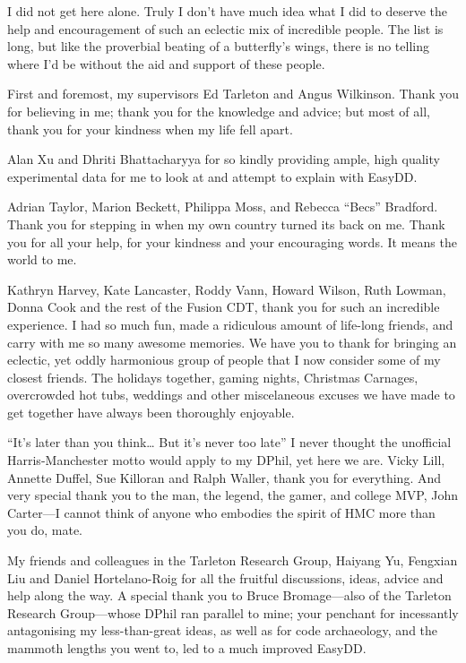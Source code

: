 \begin{frontmatter}[Acknowledgements]

    \begin{justify}
        I did not get here alone. Truly I don't have much idea what I did to deserve the help and encouragement of such an eclectic mix of incredible people. The list is long, but like the proverbial beating of a butterfly's wings, there is no telling where I'd be without the aid and support of these people.

        First and foremost, my supervisors Ed Tarleton and Angus Wilkinson. Thank you for believing in me; thank you for the knowledge and advice; but most of all, thank you for your kindness when my life fell apart.

        Alan Xu and Dhriti Bhattacharyya for so kindly providing ample, high quality experimental data for me to look at and attempt to explain with EasyDD.

        Adrian Taylor, Marion Beckett, Philippa Moss, and Rebecca ``Becs'' Bradford. Thank you for stepping in when my own country turned its back on me. Thank you for all your help, for your kindness and your encouraging words. It means the world to me.

        Kathryn Harvey, Kate Lancaster, Roddy Vann, Howard Wilson, Ruth Lowman, Donna Cook and the rest of the Fusion CDT, thank you for such an incredible experience. I had so much fun, made a ridiculous amount of life-long friends, and carry with me so many awesome memories. We have you to thank for bringing an eclectic, yet oddly harmonious group of people that I now consider some of my closest friends. The holidays together, gaming nights, Christmas Carnages, overcrowded hot tubs, weddings and other miscelaneous excuses we have made to get together have always been thoroughly enjoyable.

        ``It's later than you think\ldots{} But it's never too late'' I never thought the unofficial Harris-Manchester motto would apply to my DPhil, yet here we are. Vicky Lill, Annette Duffel, Sue Killoran and Ralph Waller, thank you for everything. And very special thank you to the man, the legend, the gamer, and college MVP, John Carter---I cannot think of anyone who embodies the spirit of HMC more than you do, mate.

        My friends and colleagues in the Tarleton Research Group, Haiyang Yu, Fengxian Liu and Daniel Hortelano-Roig for all the fruitful discussions, ideas, advice and help along the way. A special thank you to Bruce Bromage---also of the Tarleton Research Group---whose DPhil ran parallel to mine; your penchant for incessantly antagonising my less-than-great ideas, as well as for code archaeology, and the mammoth lengths you went to, led to a much improved EasyDD.


\end{justify}
\end{frontmatter}
